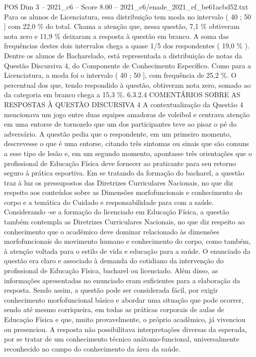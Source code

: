 \begin{textsample}{POS Dim 3 – 2021\_c6 – Score 8.00 – 2021\_c6/enade\_2021\_ef\_be61acbd52.txt}
Para os alunos de Licenciatura, essa distribuição tem moda no intervalo ( 40 ; 50 ] com 22,0 \% do total.
Chama a atenção que, nessa questão, 7,1 \% obtiveram nota zero e 11,9 \% deixaram a resposta à questão em branco.
A soma das frequências destes dois intervalos chega a quase 1/5 dos respondentes ( 19,0 \% ).
Dentre os alunos de Bacharelado, está representada a distribuição de notas da Questão Discursiva 4, do Componente de Conhecimento Específico.
Como para a Licenciatura, a moda foi o intervalo ( 40 ; 50 ], com frequência de 25,2 \%.
O percentual dos que, tendo respondido à questão, obtiveram nota zero, somado ao da categoria em branco chega a 15,3 \%. 6.3.2.4 COMENTÁRIOS SOBRE AS RESPOSTAS À QUESTÃO DISCURSIVA 4 A contextualização da Questão 4 mencionava um jogo entre duas equipes amadoras de voleibol e centrava atenção em uma entorse de tornozelo que um dos participantes teve ao pisar o pé do adversário.
A questão pedia que o respondente, em um primeiro momento, descrevesse o que é uma entorse, citando três sintomas ou sinais que são comuns a esse tipo de lesão e, em um segundo momento, apontasse três orientações que o profissional de Educação Física deve fornecer ao praticante para seu retorno seguro à prática esportiva.
Em se tratando da formação do bacharel, a questão traz à luz os pressupostos das Diretrizes Curriculares Nacionais, no que diz respeito aos conteúdos sobre as Dimensões morfofuncionais e conhecimento do corpo e a temática do Cuidado e responsabilidade para com a saúde.
Considerando -se a formação do licenciado em Educação Física, a questão também contempla as Diretrizes Curriculares Nacionais, no que diz respeito ao conhecimento que o acadêmico deve dominar relacionado às dimensões morfofuncionais do movimento humano e conhecimento do corpo, como também, à atenção voltada para o estilo de vida e educação para a saúde.
O enunciado da questão era claro e associado à demanda do cotidiano da intervenção do profissional de Educação Física, bacharel ou licenciado.
Além disso, as informações apresentadas no enunciado eram suficientes para a elaboração da resposta.
Sendo assim, a questão pode ser considerada fácil, por exigir conhecimento morfofuncional básico e abordar uma situação que pode ocorrer, sendo até mesmo corriqueira, em todas as práticas corporais de aulas de Educação Física e que, muito provavelmente, o próprio acadêmico, já vivenciou ou presenciou.
A resposta não possibilitava interpretações diversas da esperada, por se tratar de um conhecimento técnico anátomo-funcional, universalmente reconhecido no campo do conhecimento da área da saúde.

\end{textsample}

